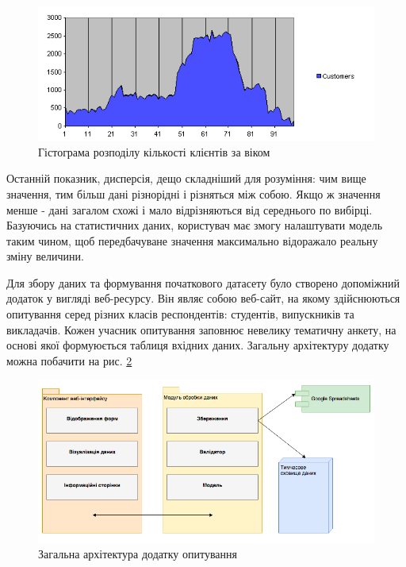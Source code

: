\begin{figure}[h!]
  \includegraphics[width=\linewidth]{figures/statistics.png}
  \caption{Гістограма розподілу кількості клієнтів за віком}
  \label{fig:statistics}
\end{figure}

Останній показник, дисперсія, дещо складніший для розуміння: чим вище значення, тим більш дані різнорідні і різняться між собою. Якщо ж значення менше - дані загалом схожі і мало відрізняються від середнього по вибірці. Базуючись на статистичних даних, користувач має змогу налаштувати модель таким чином, щоб передбачуване значення максимально відоражало реальну зміну величини.

Для збору даних та формування початкового датасету було створено допоміжний додаток у вигляді веб-ресурсу. Він являє собою веб-сайт, на якому здійснюються опитування серед різних класів респондентів: студентів, випускників та викладачів. Кожен учасник опитування заповнює невелику тематичну анкету, на основі якої формуюється таблиця вхідних даних. Загальну архітектуру додатку можна побачити на рис. \ref{fig:poll_architecture} 

\begin{figure}[h!]
  \includegraphics[width=\linewidth]{figures/poll_architecture.png}
  \caption{Загальна архітектура додатку опитування}
  \label{fig:poll_architecture}
\end{figure}

